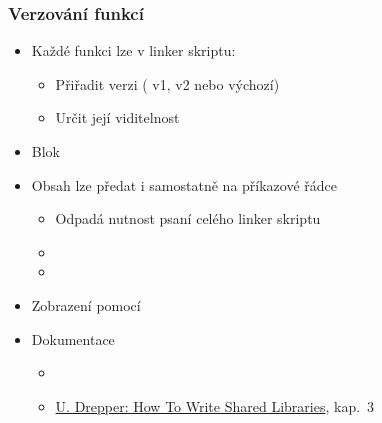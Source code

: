 \begin{frame}
  \frametitle{Verzování funkcí}

  \begin{itemize}
    \item Každé funkci lze v linker skriptu:
    \begin{itemize}
      \item Přiřadit verzi ( v1,  v2 nebo výchozí)
      \item Určit její viditelnost
    \end{itemize}

    \pause

    \item Blok 

    \pause

    \item Obsah  lze předat i samostatně na příkazové řádce
    \begin{itemize}
      \item Odpadá nutnost psaní celého linker skriptu
      \item {}
      \item {}
    \end{itemize}

    \item Zobrazení pomocí 

    \pause

    \item Dokumentace
    \begin{itemize}
      \item {}
      \item \href{http://people.redhat.com/drepper/dsohowto.pdf}{U. Drepper: How To Write Shared Libraries}, kap.\ 3
    \end{itemize}
  \end{itemize}

\end{frame}

